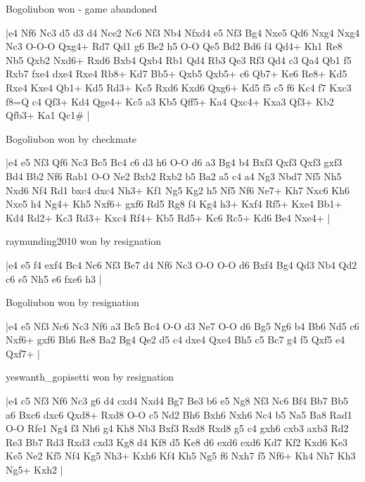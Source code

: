 Bogoliubon won - game abandoned

\makegametitle
|e4 Nf6 Nc3 d5 d3 d4 Nce2 Nc6 Nf3 Nb4 Nfxd4 e5 Nf3 Bg4 Nxe5 Qd6 Nxg4 Nxg4 Nc3 O-O-O Qxg4+ Rd7 Qd1 g6 Be2 h5 O-O Qe5 Bd2 Bd6 f4 Qd4+ Kh1 Re8 Nb5 Qxb2 Nxd6+ Rxd6 Bxb4 Qxb4 Rb1 Qd4 Rb3 Qe3 Rf3 Qd4 c3 Qa4 Qb1 f5 Rxb7 fxe4 dxe4 Rxe4 Rb8+ Kd7 Bb5+ Qxb5 Qxb5+ c6 Qb7+ Ke6 Re8+ Kd5 Rxe4 Kxe4 Qb1+ Kd5 Rd3+ Kc5 Rxd6 Kxd6 Qxg6+ Kd5 f5 c5 f6 Kc4 f7 Kxc3 f8=Q c4 Qf3+ Kd4 Qge4+ Kc5 a3 Kb5 Qff5+ Ka4 Qxc4+ Kxa3 Qf3+ Kb2 Qfb3+ Ka1 Qc1\#  |

\showboard

Bogoliubon won by checkmate

\makegametitle
|e4 e5 Nf3 Qf6 Nc3 Bc5 Bc4 c6 d3 h6 O-O d6 a3 Bg4 b4 Bxf3 Qxf3 Qxf3 gxf3 Bd4 Bb2 Nf6 Rab1 O-O Ne2 Bxb2 Rxb2 b5 Ba2 a5 c4 a4 Ng3 Nbd7 Nf5 Nh5 Nxd6 Nf4 Rd1 bxc4 dxc4 Nh3+ Kf1 Ng5 Kg2 h5 Nf5 Nf6 Ne7+ Kh7 Nxc6 Kh6 Nxe5 h4 Ng4+ Kh5 Nxf6+ gxf6 Rd5 Rg8 f4 Kg4 h3+ Kxf4 Rf5+ Kxe4 Bb1+ Kd4 Rd2+ Kc3 Rd3+ Kxc4 Rf4+ Kb5 Rd5+ Kc6 Rc5+ Kd6 Be4 Nxe4+  |

\showboard

raymunding2010 won by resignation

\makegametitle
|e4 e5 f4 exf4 Bc4 Nc6 Nf3 Be7 d4 Nf6 Nc3 O-O O-O d6 Bxf4 Bg4 Qd3 Nb4 Qd2 c6 e5 Nh5 e6 fxe6 h3  |

\showboard

Bogoliubon won by resignation

\makegametitle
|e4 e5 Nf3 Nc6 Nc3 Nf6 a3 Bc5 Bc4 O-O d3 Ne7 O-O d6 Bg5 Ng6 b4 Bb6 Nd5 c6 Nxf6+ gxf6 Bh6 Re8 Ba2 Bg4 Qe2 d5 c4 dxe4 Qxe4 Bh5 c5 Bc7 g4 f5 Qxf5 e4 Qxf7+  |

\showboard

yeswanth\_gopisetti won by resignation

\makegametitle
|e4 c5 Nf3 Nf6 Nc3 g6 d4 cxd4 Nxd4 Bg7 Be3 b6 e5 Ng8 Nf3 Nc6 Bf4 Bb7 Bb5 a6 Bxc6 dxc6 Qxd8+ Rxd8 O-O c5 Nd2 Bh6 Bxh6 Nxh6 Nc4 b5 Na5 Ba8 Rad1 O-O Rfe1 Ng4 f3 Nh6 g4 Kh8 Nb3 Bxf3 Rxd8 Rxd8 g5 c4 gxh6 cxb3 axb3 Rd2 Re3 Bb7 Rd3 Rxd3 cxd3 Kg8 d4 Kf8 d5 Ke8 d6 exd6 exd6 Kd7 Kf2 Kxd6 Ke3 Ke5 Ne2 Kf5 Nf4 Kg5 Nh3+ Kxh6 Kf4 Kh5 Ng5 f6 Nxh7 f5 Nf6+ Kh4 Nh7 Kh3 Ng5+ Kxh2  |

